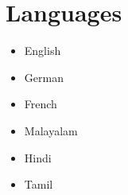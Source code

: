 \documentclass{my_cv}%
\begin{document}
\section{Languages}
\vspace{1em}
\noindent
\begin{minipage}{0.4\textwidth}
\begin{itemize}
\setlength\itemsep{0.0em}
\item[] English  \hspace{0.5em}  
\item[] German  \hspace{0.2em}  
\item[] French  \hspace{0.8em} 
\end{itemize}
\end{minipage}
\begin{minipage}{0.4\textwidth}
\begin{itemize}
\setlength\itemsep{0.0em}
\item[] Malayalam  \hspace{0.5em}  
\item[] Hindi      \hspace{2.9em}  
\item[] Tamil      \hspace{2.9em} 
\end{itemize}
\end{minipage}
\vspace{2em}
\end{document}
